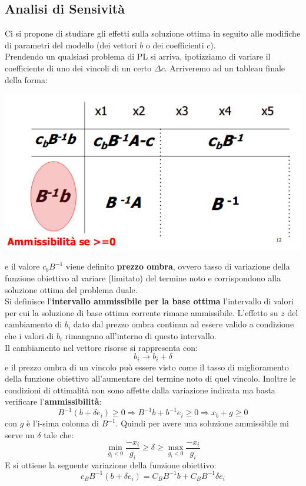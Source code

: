 \documentclass[a4paper,12pt, oneside]{book}
\begin{document}
\subsection{Analisi di Sensività}
Ci si propone di studiare gli effetti sulla soluzione ottima in
seguito alle modifiche di parametri del modello (dei vettori $b$ o dei
coefficienti $c$).\\
Prendendo un qualsiasi problema di PL si arriva, ipotizziamo di
variare il coefficiente di uno dei vincoli di un certo $\Delta
c$. Arriveremo ad un tableau finale della forma:
\begin{center}
  \includegraphics[scale = 0.7]{img/add.png}
\end{center}
e il valore $c_bB^{-1}$ viene definito \textbf{prezzo ombra}, ovvero
tasso di variazione della funzione obiettivo al variare (limitato)
del termine noto e corrispondono alla soluzione ottima del problema
duale.\\
Si definisce l'\textbf{intervallo ammissibile per la base ottima}
l'intervallo di valori per cui la soluzione di base ottima corrente
rimane ammissibile. L'effetto su $z$ del cambiamento di $b_i$ dato dal
prezzo ombra continua ad essere valido a condizione che i valori di
$b_i$ rimangano all'interno di questo intervallo.\\
Il cambiamento nel vettore risorse si rappresenta con:
\[b_i\to b_i+\delta\]
e il prezzo ombra di un vincolo può essere visto come il tasso di
miglioramento della funzione obiettivo all'aumentare del termine noto
di quel vincolo. Inoltre le condizioni di ottimalità non sono affette
dalla variazione indicata ma basta verificare
l'\textbf{ammissibilità}:
\[B^{-1}(b+\delta e_i)\geq 0\Longrightarrow B^{-1}b+b^{-1}e_i\geq
  0\Longrightarrow x_b+g\geq 0\]
con $g$ è l'i-sima colonna di $B^{-1}$. Quindi per avere una soluzione
ammissibile mi serve un $\delta$ tale che:
\[\min_{g_i<0}\frac{-x_i}{g_i}\geq \delta \geq \max_{g_i<0}\frac{-x_i}{g_i}\]
E si ottiene la seguente variazione della funzione obiettivo:
\[c_BB^{-1}(b+\delta e_i)=C_BB^{-1}b+C_BB^{-1}\delta e_i\]
\end{document}
